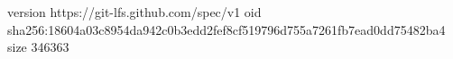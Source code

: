 version https://git-lfs.github.com/spec/v1
oid sha256:18604a03c8954da942c0b3edd2fef8cf519796d755a7261fb7ead0dd75482ba4
size 346363

